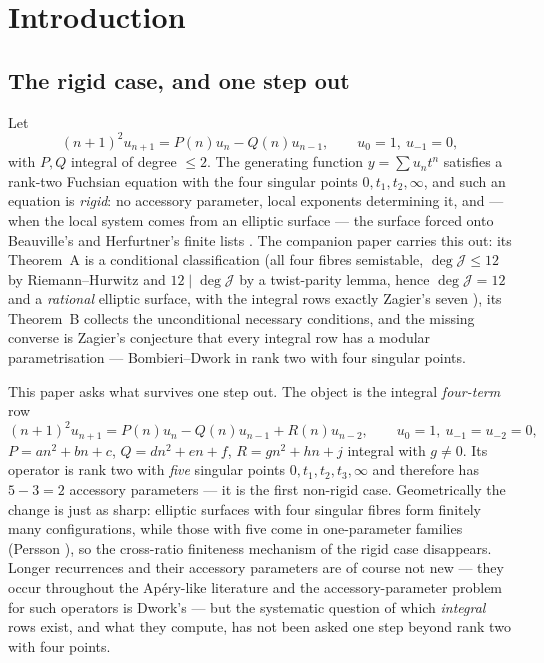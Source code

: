 \documentclass[11pt,reqno]{amsart}
\theoremstyle{plain}
\theoremstyle{definition}
\theoremstyle{remark}
\theoremstyle{plain}
\newcommand{\Jm}{\mathcal J}
\begin{document}
\section{Introduction}\label{sec:intro}

\subsection{The rigid case, and one step out}
Let
\begin{equation}\label{eq:three}
(n+1)^2u_{n+1}=P(n)u_n-Q(n)u_{n-1},\qquad u_0=1,\ u_{-1}=0,
\end{equation}
with $P,Q$ integral of degree $\le2$. The generating function $y=\sum u_nt^n$
satisfies a rank-two Fuchsian equation with the four singular points
$0,t_1,t_2,\infty$, and such an equation is \emph{rigid}: no accessory parameter,
local exponents determining it, and --- when the local system comes from an
elliptic surface --- the surface forced onto Beauville's and Herfurtner's finite
lists \cite{Beauville1982,Herfurtner1991}. The companion paper \cite{CLASS}
carries this out: its Theorem~A is a conditional classification (all four fibres
semistable, $\deg\Jm\le12$ by Riemann--Hurwitz and $12\mid\deg\Jm$ by a
twist-parity lemma, hence $\deg\Jm=12$ and a \emph{rational} elliptic surface,
with the integral rows exactly Zagier's seven \cite{Zagier2009}), its Theorem~B
collects the unconditional necessary conditions, and the missing converse is
Zagier's conjecture that every integral row has a modular parametrisation ---
Bombieri--Dwork in rank two with four singular points.

This paper asks what survives one step out. The object is the integral
\emph{four-term} row
\begin{equation}\label{eq:four}
(n+1)^2u_{n+1}=P(n)u_n-Q(n)u_{n-1}+R(n)u_{n-2},\qquad u_0=1,\ u_{-1}=u_{-2}=0,
\end{equation}
$P=an^2+bn+c$, $Q=dn^2+en+f$, $R=gn^2+hn+j$ integral with $g\ne0$. Its operator
is rank two with \emph{five} singular points $0,t_1,t_2,t_3,\infty$ and
therefore has $5-3=2$ accessory parameters --- it is the first non-rigid case.
Geometrically the change is just as sharp: elliptic surfaces with four singular
fibres form finitely many configurations, while those with five come in
one-parameter families (Persson \cite{Persson1990}), so the cross-ratio
finiteness mechanism of the rigid case disappears. Longer recurrences and their
accessory parameters are of course not new --- they occur throughout the
Ap\'ery-like literature \cite{AlmkvistZudilin2006,Cooper2012,MovasatiReiter} and
the accessory-parameter problem for such operators is Dwork's
\cite{Beukers2002} --- but the systematic question of which \emph{integral} rows
exist, and what they compute, has not been asked one step beyond rank two with
four points.
\end{document}
